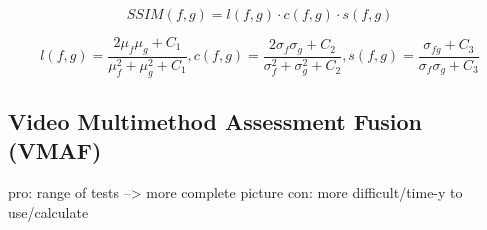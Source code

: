 \begin{equation}
SSIM(f,g) = l(f,g) \cdot c(f,g) \cdot s(f,g)
\label{equation:metrics:SSIM_1}
\end{equation}

\begin{equation}
l(f,g) = \dfrac{2\mu_{f}\mu_{g}+C_{1}}{\mu_{f}^{2} + \mu_{g}^{2}+C_{1}}, 
c(f,g) = \dfrac{2\sigma_{f}\sigma_{g}+C_{2}}{\sigma_{f}^{2} + \sigma_{g}^{2}+C_{2}}, 
s(f,g) = \dfrac{\sigma_{fg}+C_{3}}{\sigma_{f}\sigma_{g}+C_{3}}
\label{equation:metrics:SSIM_2}
\end{equation}

\subsection{Video Multimethod Assessment Fusion (VMAF)}
pro: range of tests --> more complete picture
con: more difficult/time-y to use/calculate

